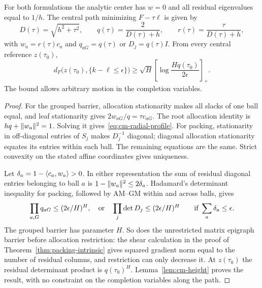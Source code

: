 \begin{proposition}
\label{prop:cm-grouped}
For both formulations the analytic center has $w=0$ and all residual
eigenvalues equal to $1/h$.  The central path minimizing $F-\tau\ell$
is given by
\begin{equation}\label{eq:cm-radial-profile}
 D(\tau)=\sqrt{h^2+\tau^2},\qquad
 q(\tau)=\frac{2}{D(\tau)+h},\qquad
 r(\tau)=\frac{\tau}{D(\tau)+h},
\end{equation}
with $w_a=r(\tau)c_a$ and $q_{aG}=q(\tau)$ or
$D_j=q(\tau)I$.  From every central reference $z(\tau_0)$,
\begin{equation}\label{eq:cm-grouped-distance}
 d_F\bigl(z(\tau_0),\{k-\ell\leq\epsilon\}\bigr)
 \geq\sqrt H\left[\log\frac{Hq(\tau_0)}{2\epsilon}\right]_+.
\end{equation}
The bound allows arbitrary motion in the completion variables.
\end{proposition}
\begin{proof}
For the grouped barrier, allocation stationarity makes all slacks of
one ball equal, and leaf stationarity gives $2w_{aG}/q=\tau c_{aG}$.
The root allocation identity is $hq+\lVert w_a\rVert^2=1$.
Solving it gives~\eqref{eq:cm-radial-profile}.
For packing, stationarity in off-diagonal entries of $S_j$ makes
$D_j^{-1}$ diagonal; diagonal allocation stationarity equates its
entries within each ball.  The remaining equations are the same.
Strict convexity on the stated affine coordinates gives uniqueness.

Let $\delta_a=1-\langle c_a,w_a\rangle>0$.  In either representation the sum
of residual diagonal entries belonging to ball $a$ is
$1-\lVert w_a\rVert^2\leq2\delta_a$.  Hadamard's determinant inequality
for packing, followed by AM--GM within and across balls, gives
\[
 \prod_{a,G}q_{aG}\leq(2\epsilon/H)^H,
 \quad\hbox{or}\quad
 \prod_j\det D_j\leq(2\epsilon/H)^H
 \qquad\text{if }\sum_a\delta_a\leq\epsilon.
\]
The grouped barrier has parameter $H$.  So does the unrestricted
matrix epigraph barrier before allocation restriction: the shear
calculation in the proof of Theorem~\ref{thm:packing-intrinsic} gives
squared gradient norm equal to the number of residual columns, and
restriction can only decrease it.  At $z(\tau_0)$ the residual
determinant product is $q(\tau_0)^H$.
Lemma~\ref{lem:cm-height} proves the result, with no constraint on
the completion variables along the path.
\end{proof}

